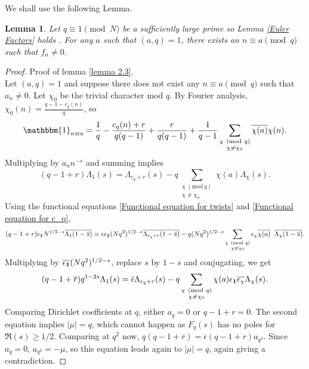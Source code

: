 \documentclass[a4paper,12.5pt]{amsart}
\newtheorem{lem}[thm]{Lemma}
\theoremstyle{definition}
\theoremstyle{remark}
\newcommand{\Mod}[1]{\ (\mathrm{mod}\ #1)}
\begin{document}
                                We shall use the following Lemma. \begin{lem}{\label{lemma 2.3}}
                                Let $q  \equiv 1 \pmod{N}$ be a sufficiently large prime so Lemma \ref{Euler Factors} holds . For any $a$ such that $(a,q)=1$, there exists an $n \equiv a \pmod{q}$ such that $f_n \neq 0$. 
                                \end{lem}
                                
                                 \begin{proof}{ Proof of lemma \ref{lemma 2.3}.} \\
                 
             Let $ (a,q)=1$ and suppose there does not exist any $n \equiv a \pmod q$ such that $a_n \neq 0$.  Let $\chi_0$ be the trivial character mod $q$. By Fourier analysis, $\chi_0(n)= \frac{q-1 - c_q(n)}{q}$, so
                \[ \mathbbm{1}_ {n \equiv a}= \frac{ 1}{q}- \frac{c_q(n)+r}{q(q-1)} + \frac{r}{q(q-1)} + \frac{1}{q-1} \sum_{ \substack{ \chi \Mod q \\ \chi \neq \chi_0}} \overline{\chi(a)} \chi(n)   .  \]
                Multiplying by $a_n n^{-s}$ and summing implies
                \[  \left(  q-1+r    \right)    \Lambda_1(s)
                =    \Lambda_{c_q+r} (s) - q   \sum_{ \substack{ \chi \Mod q \\ \chi \neq \chi_0}} \overline{\chi(a)} \Lambda_{\chi} (s)    .    \]
                Using the functional equations \eqref{Functional equation for twists} and \eqref{Functional equation for c_q}, 
                \[ (q-1+r) \epsilon_{\bold{1}} N^{1/2-s} \overline{ \Lambda_1 (1- \overline{s})}      = \epsilon \epsilon_{\bold{1}} (Nq^2)^{1/2-s} \overline{ \Lambda_{c_q+r} (1- \overline{s})   }-  q  (Nq^2)^{1/2 -s}   \sum_{ \substack{ \chi \Mod q \\ \chi \neq \chi_0}} \epsilon_{\chi} \overline{\chi(a)} \; \; \overline{\Lambda_{\chi} (1- \overline{s})   }  .   \]
                Multiplying by $\overline{\epsilon_{\bold{1}}} (Nq^2)^{1/2-s}$, replace $s$ by $1- \overline{s}$ and conjugating, we get
                \[   (q-1+ \overline{r}) q^{1-2s} \Lambda_1 (s) = \overline{\epsilon} \Lambda_{c_q+r} (s) - q    \sum_{ \substack{ \chi \Mod q \\ \chi \neq \chi_0}} \chi(a) \epsilon_{\bold{1}} \overline{ \epsilon_{\chi}} \Lambda_{\chi} (s).                  \]
                 Comparing Dirichlet coefficients at $q$, either $a_q=0$ or $q-1+r=0$. The second equation 
                 implies $|\mu|=q$, which cannot happen as $F_q(s)$ has no poles for $\Re(s)\geq 1/2$. 
                 Comparing at $q^2$ now, $q(q-1+\overline{r}) = \overline{\epsilon} ( q-1+r) a_{q^2}$. Since $a_q=0$, $a_{q^2}=- \mu$, so this equation leads again to $|\mu|=q$, again giving a contradiction. 
               \end{proof}
\end{document}
